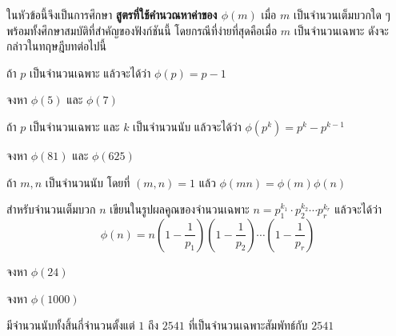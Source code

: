 ในหัวข้อนี้จึงเป็นการศึกษา \textbf{สูตรที่ใช้คำนวณหาค่าของ $\phi(m)$} เมื่อ $m$ เป็นจำนวนเต็มบวกใด ๆ พร้อมทั้งศึกษาสมบัติที่สำคัญของฟังก์ชันนี้ โดยกรณีที่ง่ายที่สุดคือเมื่อ $m$ เป็นจำนวนเฉพาะ ดังจะกล่าวในทฤษฎีบทต่อไปนี้ 

\begin{theorembox}
	ถ้า $p$ เป็นจำนวนเฉพาะ แล้วจะได้ว่า $\phi(p)=p-1$
\end{theorembox}

\begin{examplebox}
	จงหา $\phi(5)$ และ $\phi(7)$ \\   
\end{examplebox} 
\solution
\vspace{3cm}  


\begin{theorembox}
	ถ้า $p$ เป็นจำนวนเฉพาะ และ $k$ เป็นจำนวนนับ แล้วจะได้ว่า $\phi(p^k)=p^k-p^{k-1}$
\end{theorembox}

\begin{examplebox}
	จงหา $\phi(81)$ และ $\phi(625)$\\  
\end{examplebox} 
\solution

\newpage
\begin{theorembox}
	ถ้า $m,n$ เป็นจำนวนนับ โดยที่ $(m,n)=1$ แล้ว $\phi(mn)=\phi(m)\phi(n)$
\end{theorembox}

\begin{theorembox}
	สําหรับจํานวนเต็มบวก $n$ เขียนในรูปผลคูณของจํานวนเฉพาะ $n=p^{k_1}_1\cdot p^{k_2}_2 \cdots p^{k_r}_r$ แล้วจะได้ว่า
	\[\phi(n)=n\left(1-\dfrac{1}{p_1}\right)\left(1-\dfrac{1}{p_2}\right)\cdots\left(1-\dfrac{1}{p_r}\right)\]
\end{theorembox}

\begin{examplebox}
	จงหา $\phi(24)$   
\end{examplebox} 
\solution
\vspace{2cm}  


\begin{examplebox}
	จงหา $\phi(1000)$  
\end{examplebox} 
\solution

\vspace{2cm}  
\begin{examplebox}
	มีจำนวนนับทั้งสิ้นกี่จำนวนตั้งแต่ $1$ ถึง $2541$ ที่เป็นจำนวนเฉพาะสัมพัทธ์กับ $2541$
\end{examplebox} 
\solution   

